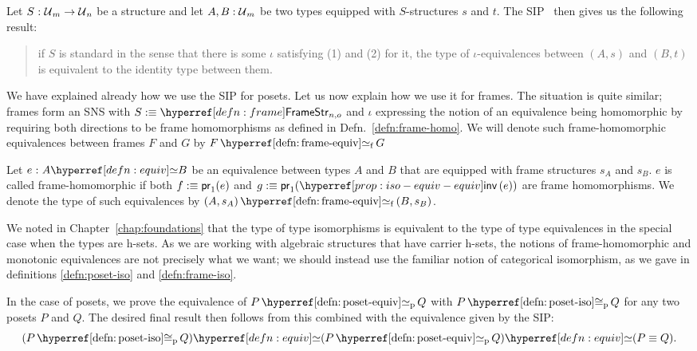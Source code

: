 Let $S\hspace{0.1mm}:\hspace{0.1mm}\mathcal{U}{}_m \rightarrow \mathcal{U}{}_n$ be a structure and let $A, B:\mathcal{U}{}_m$
be two types equipped with $S$-structures $s$ and $t$. The SIP~\cite{escardo-uf-intro, agda-cubical}
then gives us the following result:
\begin{quote}
  if $S$ is standard in the sense that there is some $\iota$ satisfying (1) and (2) for it,
  the type of $\iota$-equivalences between $(A, s)$ and $(B, t)$ is equivalent to the identity
  type between them.
\end{quote}

We have explained already how we use the SIP for posets. Let us now explain how we use it
for frames. The situation is quite similar; frames form an SNS with $S \is
\framestrnm{}_{n, o}$ and $\iota$ expressing the notion of an equivalence being homomorphic by
requiring both directions to be frame homomorphisms as defined in
Defn.~\ref{defn:frame-homo}. We will denote such frame-homomorphic equivalences between
frames $F$ and $G$ by $\frameequiv{F}{G}$

\begin{defn}\label{defn:frame-equiv}
  Let $\oftyI{e}{\typequiv{A}{B}}$ be an equivalence between types $A$ and $B$ that are
  equipped with frame structures $s_A$ and $s_B$. $e$ is called frame-homomorphic if both
  $f :\equiv \mathsf{pr}_1(e)$ and $g \is \mathsf{pr}_1(\invequiv{e})$ are frame
  homomorphisms. We denote the type of such equivalences by
  $\frameequiv{(A, s_A)}{(B , s_B)}$.
\end{defn}

We noted in Chapter~\ref{chap:foundations} that the type of type isomorphisms is
equivalent to the type of type equivalences in the special case when the types are h-sets.
As we are working with algebraic structures that have carrier h-sets, the notions of
frame-homomorphic and monotonic equivalences are not precisely what we want; we should
instead use the familiar notion of categorical isomorphism, as we gave in definitions
\ref{defn:poset-iso} and \ref{defn:frame-iso}.

In the case of posets, we prove the equivalence of $\posetequiv{P}{Q}$ with
$\posetiso{P}{Q}$ for any two posets $P$ and $Q$. The desired final result then follows
from this combined with the equivalence given by the SIP:
\begin{equation*}
  \typequiv{(\posetiso{P}{Q})}{\typequiv{(\posetequiv{P}{Q})}{(P \equiv Q)}}.
\end{equation*}

